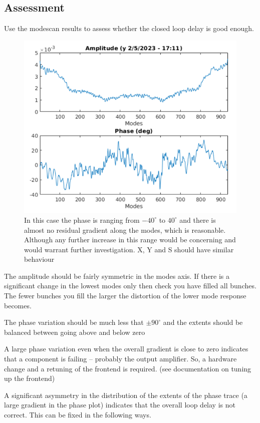 \documentclass{report}
\begin{document}
\subsection{Assessment} 

Use the modescan results to assess whether the closed loop delay is good enough.
 
\begin{figure}[ht]
    \centering
    \includegraphics[width=0.8\linewidth]{initial_modescan.png}
    \caption{In this case the phase is ranging from $-40^\circ$ to $40^\circ$ and there is almost no residual gradient along the modes, which is reasonable. Although any further increase in this range would be concerning and would warrant further investigation. X, Y and S should have similar behaviour}
    \label{fig:example_modescan}
\end{figure}

 
The amplitude should be fairly symmetric in the modes axis. If there is a significant change in the lowest modes only then check you have filled all bunches. The fewer bunches you fill the larger the distortion of the lower mode response becomes. 

The phase variation should be much less that $\pm90^\circ$ and the extents should be balanced between going above and below zero 

A large phase variation even when the overall gradient is close to zero indicates that a component is failing – probably the output amplifier. So, a hardware change and a retuning of the frontend is required. (see documentation on tuning up the frontend)

A significant asymmetry in the distribution of the extents of the phase trace (a large gradient in the phase plot) indicates that the overall loop delay is not correct. This can be fixed in the following ways. 
\end{document}
